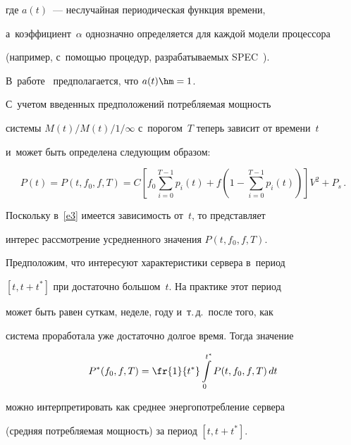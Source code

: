 где $a(t)$~--- неслучайная периодическая функция времени, 

а~коэффициент~$\alpha$ однозначно определяется для каждой модели процессора 

(например, с~по\-мощью процедур, разрабатываемых SPEC~\cite{a14}).

В~работе~\cite{a2} предполагается, что $a(t)\hm=1$.

С~учетом введенных предположений потребляемая мощность

системы $M(t)/M(t)/1/\infty$ с~порогом~$T$ теперь зависит от времени~$t$ 

и~может быть определена следующим образом:

\begin{equation}

\label{e3}

P(t)=P\left(t,f_0,f,T\right)=C \left [

f_0 \sum\limits_{i=0}^{T-1} p_i(t) + f \left (

1-\sum\limits_{i=0}^{T-1} p_i(t) \right )

\right ]

V^2+P_s\,.

\end{equation}

Поскольку в~\eqref{e3} имеется зависимость от~$t$, то представляет

интерес рассмотрение усредненного значения $P(t,f_0,f,T)$.

Предположим, что интересуют характеристики сервера в~период

$[t,t+t^*]$ при достаточно большом~$t$. На практике этот период

может быть равен суткам, неделе, году и~т.\,д.\ после того, как

система проработала уже достаточно долгое время. Тогда значение



\noindent

\begin{equation}

\label{e4}

P^*(f_0,f,T) = \fr{1}{t^*}\int\limits_0^{t^*}

P(t,f_0,f,T)\,dt

\end{equation}

можно интерпретировать как среднее энерго\-по\-треб\-ле\-ние сервера 

(средняя по\-треб\-ля\-емая мощность) за период $[t,t+t^*]$.







